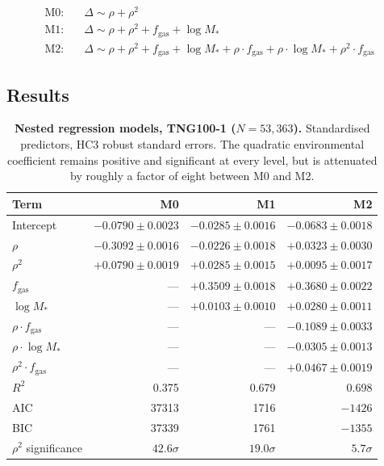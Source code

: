 \begin{align}
\text{M0:}\quad & \Delta \sim \rho + \rho^2 \\
\text{M1:}\quad & \Delta \sim \rho + \rho^2 + f_{\mathrm{gas}} + \log M_* \\
\text{M2:}\quad & \Delta \sim \rho + \rho^2 + f_{\mathrm{gas}} + \log M_*
  + \rho\!\cdot\!f_{\mathrm{gas}} + \rho\!\cdot\!\log M_* + \rho^2\!\cdot\!f_{\mathrm{gas}}
\end{align}

\subsection*{Results}

\begin{table}[htbp]
\centering
\caption{\textbf{Nested regression models, TNG100-1 ($N = 53{,}363$).} Standardised
predictors, HC3 robust standard errors. The quadratic environmental coefficient
remains positive and significant at every level, but is attenuated by roughly a
factor of eight between M0 and M2.}
\small
\begin{tabular}{@{}lrrr@{}}
\toprule
\textbf{Term} & \textbf{M0} & \textbf{M1} & \textbf{M2} \\
\midrule
Intercept                        & $-0.0790 \pm 0.0023$ & $-0.0285 \pm 0.0016$ & $-0.0683 \pm 0.0018$ \\
$\rho$                           & $-0.3092 \pm 0.0016$ & $-0.0226 \pm 0.0018$ & $+0.0323 \pm 0.0030$ \\
$\rho^2$                         & $+0.0790 \pm 0.0019$ & $+0.0285 \pm 0.0015$ & $+0.0095 \pm 0.0017$ \\
$f_{\mathrm{gas}}$               & ---                  & $+0.3509 \pm 0.0018$ & $+0.3680 \pm 0.0022$ \\
$\log M_*$                       & ---                  & $+0.0103 \pm 0.0010$ & $+0.0280 \pm 0.0011$ \\
$\rho \cdot f_{\mathrm{gas}}$    & ---                  & ---                  & $-0.1089 \pm 0.0033$ \\
$\rho \cdot \log M_*$            & ---                  & ---                  & $-0.0305 \pm 0.0013$ \\
$\rho^2 \cdot f_{\mathrm{gas}}$  & ---                  & ---                  & $+0.0467 \pm 0.0019$ \\
\midrule
$R^2$                            & 0.375   & 0.679  & 0.698 \\
AIC                              & 37313   & 1716   & $-1426$ \\
BIC                              & 37339   & 1761   & $-1355$ \\
\midrule
$\rho^2$ significance            & $42.6\sigma$ & $19.0\sigma$ & $5.7\sigma$ \\
\bottomrule
\end{tabular}
\label{tab:S4_nested}
\end{table}

